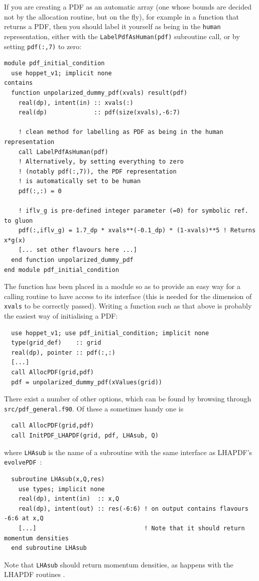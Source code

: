 \documentclass[12pt]{article}
\newcommand{\ttt}[1]{\texttt{#1}}
\begin{document}
If you are creating a PDF as an automatic array (one whose bounds are
decided not by the allocation routine, but on the fly), for example in
a function that returns a PDF, then you should label it yourself as
being in the \ttt{human} representation, either with the
\ttt{LabelPdfAsHuman(pdf)} subroutine call, or by setting
\ttt{pdf(:,7)} to zero:
\begin{lstlisting}
module pdf_initial_condition
  use hoppet_v1; implicit none
contains
  function unpolarized_dummy_pdf(xvals) result(pdf)
    real(dp), intent(in) :: xvals(:)
    real(dp)             :: pdf(size(xvals),-6:7)

    ! clean method for labelling as PDF as being in the human representation
    call LabelPdfAsHuman(pdf)
    ! Alternatively, by setting everything to zero 
    ! (notably pdf(:,7)), the PDF representation
    ! is automatically set to be human
    pdf(:,:) = 0
    
    ! iflv_g is pre-defined integer parameter (=0) for symbolic ref. to gluon
    pdf(:,iflv_g) = 1.7_dp * xvals**(-0.1_dp) * (1-xvals)**5 ! Returns x*g(x)
    [... set other flavours here ...]
  end function unpolarized_dummy_pdf
end module pdf_initial_condition
\end{lstlisting}
The function has been placed in a module so as to provide an easy way
for a calling routine to have access to its interface (this is needed
for the dimension of \ttt{xvals} to be correctly passed).  Writing a
function such as that above is probably the easiest way of
initialising a PDF:
\begin{lstlisting}
  use hoppet_v1; use pdf_initial_condition; implicit none
  type(grid_def)    :: grid
  real(dp), pointer :: pdf(:,:)
  [...]
  call AllocPDF(grid,pdf)
  pdf = unpolarized_dummy_pdf(xValues(grid))
\end{lstlisting}
There exist a number of other options, which can be found by browsing
through \ttt{src/pdf\_general.f90}. Of these a sometimes handy one is
\begin{lstlisting}
  call AllocPDF(grid,pdf)
  call InitPDF_LHAPDF(grid, pdf, LHAsub, Q)
\end{lstlisting}
where \texttt{LHAsub} is the name of a subroutine 
with the same interface as LHAPDF's \ttt{evolvePDF}~\cite{LHAPDF}:
\begin{lstlisting}
  subroutine LHAsub(x,Q,res)
    use types; implicit none
    real(dp), intent(in)  :: x,Q
    real(dp), intent(out) :: res(-6:6) ! on output contains flavours -6:6 at x,Q
    [...]                              ! Note that it should return momentum densities
  end subroutine LHAsub
\end{lstlisting}
Note that {\tt LHAsub} should return momentum densities, as
happens with the LHAPDF routines \cite{LHAPDF}.
\end{document}
